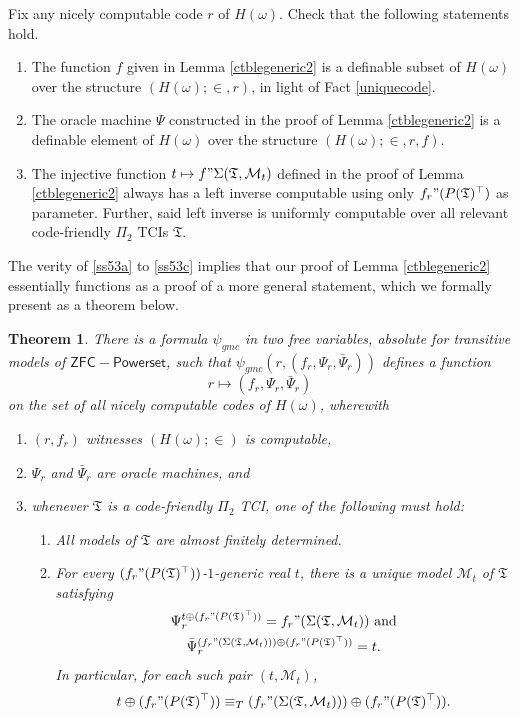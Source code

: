 \documentclass[12pt, twoside]{memoir}
\numberwithin{equation}{section}
\newtheorem{thm}{Theorem}[section]
\theoremstyle{definition}
\theoremstyle{remark}
\theoremstyle{definition}
\theoremstyle{definition}
\theoremstyle{definition}
\theoremstyle{remark}
\begin{document}
Fix any nicely computable code $r$ of $H(\omega)$. Check that the following statements hold.
\begin{enumerate}[label=(\Alph*)]
    \item\label{ss53a} The function $f$ given in Lemma \ref{ctblegeneric2} is a definable subset of $H(\omega)$ over the structure $(H(\omega); \in, r)$, in light of Fact \ref{uniquecode}.
    \item The oracle machine $\Psi$ constructed in the proof of Lemma \ref{ctblegeneric2} is a definable element of $H(\omega)$ over the structure $(H(\omega); \in, r, f)$.
    \item\label{ss53c} The injective function $t \mapsto f" \Sigma(\mathfrak{T}, \mathcal{M}_t)$ defined in the proof of Lemma \ref{ctblegeneric2} always has a left inverse computable using only $f_r" (P(\mathfrak{T})^{\top})$ as parameter. Further, said left inverse is uniformly computable over all relevant code-friendly $\Pi_2$ TCIs $\mathfrak{T}$.
\end{enumerate}
The verity of \ref{ss53a} to \ref{ss53c} implies that our proof of Lemma \ref{ctblegeneric2} essentially functions as a proof of a more general statement, which we formally present as a theorem below.

\begin{thm}\label{lastthm}
There is a formula $\psi_{gmc}$ in two free variables, absolute for transitive models of $\mathsf{ZFC - Powerset}$, such that $\psi_{gmc}(r, (f_r, \Psi_r, \bar{\Psi}_{r}))$ defines a function $$r \mapsto (f_r, \Psi_r, \bar{\Psi}_{r})$$ on the set of all nicely computable codes of $H(\omega)$, wherewith
\begin{enumerate}[label=(\arabic*)]
    \item $(r, f_r)$ witnesses $(H(\omega); \in)$ is computable,
    \item $\Psi_r$ and $\bar{\Psi}_{r}$ are oracle machines, and
    \item whenever $\mathfrak{T}$ is a code-friendly $\Pi_2$ TCI, one of the following must hold:
    \begin{enumerate}[label=(\alph*)]
        \item All models of $\mathfrak{T}$ are almost finitely determined.
        \item For every $(f_r" (P(\mathfrak{T})^{\top}))$-$1$-generic real $t$, there is a unique model $\mathcal{M}_t$ of $\mathfrak{T}$ satisfying 
        \begin{gather*}
            \Psi_r^{t \oplus (f_r" (P(\mathfrak{T})^{\top}))} = f_r" (\Sigma(\mathfrak{T}, \mathcal{M}_t)) \text{ and} \\
            \bar{\Psi}_{r}^{(f_r" (\Sigma(\mathfrak{T}, \mathcal{M}_t))) \oplus (f_r" (P(\mathfrak{T})^{\top}))} = t.
        \end{gather*}
        In particular, for each such pair $(t, \mathcal{M}_t)$, $$t \oplus (f_r" (P(\mathfrak{T})^{\top})) \equiv_{T} (f_r" (\Sigma(\mathfrak{T}, \mathcal{M}_t))) \oplus (f_r" (P(\mathfrak{T})^{\top})).$$
\end{enumerate}
\end{enumerate}
\end{thm}
\end{document}
